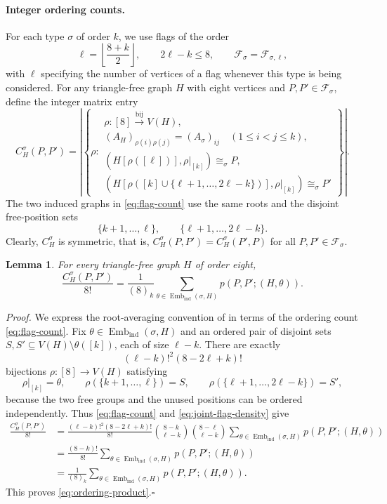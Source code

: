 \documentclass[11pt]{article}
\newtheorem{lemma}{Lemma}
\begin{document}
\paragraph{Integer ordering counts.}
For each type $\sigma$ of order $k$, we use flags of the order
\[
\ell=\left\lfloor\frac{8+k}{2}\right\rfloor,
\qquad
2\ell-k\leq8,
\qquad
\mathcal F_\sigma=\mathcal F_{\sigma,\ell},
\]
with $\ell$ specifying the number of vertices of a flag whenever this type is being considered.
For any triangle-free graph $H$ with eight vertices and $P,P'\in\mathcal F_\sigma$, define the integer matrix entry
\begin{equation}\label{eq:flag-count}
C_H^\sigma(P,P')=
\left|\left\{\rho:
\begin{array}{l}
\rho:[8]\overset{\mathrm{bij}}{\longrightarrow}V(H),\\
(A_H)_{\rho(i)\rho(j)}=(A_\sigma)_{ij}\quad(1\leq i<j\leq k),\\
(H[\rho([\ell])],\rho|_{[k]})\cong_\sigma P,\\
(H[\rho([k]\cup\{\ell+1,\ldots,2\ell-k\})],\rho|_{[k]})\cong_\sigma P'
\end{array}\right\}\right|.
\end{equation}
The two induced graphs in \eqref{eq:flag-count} use the same roots and the disjoint free-position sets
\[
\{k+1,\ldots,\ell\},
\qquad
\{\ell+1,\ldots,2\ell-k\}.
\]
Clearly, $C_H^\sigma$ is symmetric, that is,
$C_H^\sigma(P,P')=C_H^\sigma(P',P)$ for all $P,P'\in\mathcal F_\sigma$.
\begin{lemma}\label{lem:ordering-normalization}
For every triangle-free graph $H$ of order eight,
\begin{equation}\label{eq:ordering-product}
\frac{C_H^\sigma(P,P')}{8!}
=\frac1{(8)_k}
\sum_{\theta\in\operatorname{Emb}_{\mathrm{ind}}(\sigma,H)}
p(P,P';(H,\theta)).
\end{equation}
\end{lemma}
\noindent\emph{Proof.}
We express the root-averaging convention of \cite[Section~2.2]{Razborov}
in terms of the ordering count \eqref{eq:flag-count}.
Fix $\theta\in\operatorname{Emb}_{\mathrm{ind}}(\sigma,H)$ and an ordered
pair of disjoint sets $S,S'\subseteq V(H)\setminus\theta([k])$, each of
size $\ell-k$.
There are exactly
\[
(\ell-k)!^2(8-2\ell+k)!
\]
bijections $\rho:[8]\to V(H)$ satisfying
\[
\rho|_{[k]}=\theta,\qquad
\rho(\{k+1,\ldots,\ell\})=S,\qquad
\rho(\{\ell+1,\ldots,2\ell-k\})=S',
\]
because the two free groups and the unused positions can be ordered
independently.
Thus \eqref{eq:flag-count} and \eqref{eq:joint-flag-density} give
\begin{align*}
\frac{C_H^\sigma(P,P')}{8!}
&=\frac{(\ell-k)!^2(8-2\ell+k)!}{8!}
\binom{8-k}{\ell-k}\binom{8-\ell}{\ell-k}
\sum_{\theta\in\operatorname{Emb}_{\mathrm{ind}}(\sigma,H)}
p(P,P';(H,\theta))\\
&=\frac{(8-k)!}{8!}
\sum_{\theta\in\operatorname{Emb}_{\mathrm{ind}}(\sigma,H)}
p(P,P';(H,\theta))\\
&=\frac1{(8)_k}
\sum_{\theta\in\operatorname{Emb}_{\mathrm{ind}}(\sigma,H)}
p(P,P';(H,\theta)).
\end{align*}
This proves \eqref{eq:ordering-product}.\hfill$\square$
\end{document}
